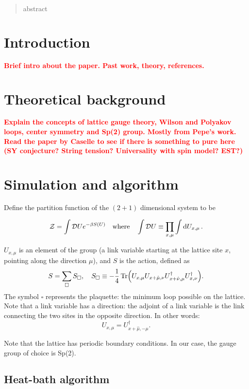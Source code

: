 \documentclass[reqno,12pt]{article}
\title{}
\date{}
\author{}
\numberwithin{equation}{section}
\newcommand{\red}[1]{\textbf{\textcolor{red}{#1}}}
\begin{document}
\begin{abstract}
	abstract
\end{abstract}

\section{Introduction}
\red{Brief intro about the paper. Past work, theory, references.}


\section{Theoretical background}
\red{Explain the concepts of lattice gauge theory, Wilson and Polyakov loops, center symmetry and Sp(2) group. 
Mostly from Pepe's work. Read the paper by Caselle to see if there is something to pure here (SY conjecture? String tension? 
Universality with spin model? EST?)}

\section{Simulation and algorithm}
Define the partition function of the $(2+1)$ dimensional system to be

\begin{equation}
	\mathcal{Z} = \int \mathcal{D}U e^{-\beta S(U)} \qq{where} \int \mathcal{D} U \equiv \prod_{x,\mu} \int \dd{U_{x,\mu}}.
\end{equation}

$U_{x,\mu}$ is an element of the group (a link variable starting at the lattice site $x$, pointing
along the direction $\mu$), 
and $S$ is the action, defined as
\begin{equation}
	S = \sum_\square S_\square \qc 
	S_\square \equiv - \frac{1}{4} \Tr(U_{x,\mu}U_{x+\hat{\mu}, \nu}U^\dagger_{x+\hat{\nu}, \mu}U^\dagger_{x,\nu}).
\end{equation}
The symbol $\square$ represents the plaquette: the minimum loop possible on the lattice. Note that a link 
variable has a direction: the adjoint of a link variable is the link connecting the two sites in the opposite
direction. In other words:
\begin{equation}
	U_{x,\mu} = U_{x+\hat{\mu}, -\mu}^\dagger.
\end{equation}

Note that the lattice has periodic boundary conditions. In our case, the gauge group of choice is Sp(2).

\subsection{Heat-bath algorithm}
\end{document}
